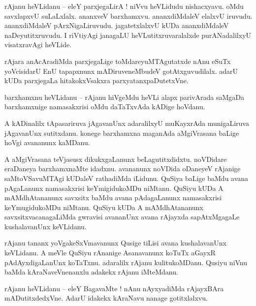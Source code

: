 \documentclass{article}
\begin{document}
\begin{mn}%
rAjanu heVLidanu -- eleY parxjegaLirA ! niVvu heVLidudu nishacxyavu. oMdu savxlapxvU suLaLxlalx. 
ananxveV barxhamxvu. ananxdiMdaleV elalxvU iruvudu. ananxdiMdaleV pArxNigaLiruvudu. jagatetxlalxvU 
kUDa ananxdiMdaleV naDeyutitxruvudu. I riVtiyAgi janagaLU heVLutitxruvaralalxde purANadalilxyU 
visatxravAgi heVLide.
\end{mn}

\begin{mn}%
rAjara anAcAradiMda parxjegaLige toMdareyuMTAgutatxde nAnu eSuTx yoVcisidarU EnU tapapxnunx 
mADiruveneMbudeV gotAtxguvudilalx. adarU kUDa parxjegaLa hitakokxVsakxra parxyatanxpaDutetxVne.
\end{mn}

\begin{mn}%
barxhamxnu heVLidanu -- rAjanu hiVgeMdu heVLi alapx parivArada saMgaDa barxhamxnige namasakxrisi 
oMdu daTaTxvAda kADige hoVdanu.
\end{mn}

\begin{mn}%
A kADinalilx tApasariruva jAgavanUnx adaralilxyU muKayxrAda munigaLiruva jAgavanUnx sutitxdanu. 
konege barxhamxna maganAda aMgiVrasana baLige hoVgi avananunx kaMDanu.
\end{mn}

\begin{mn}%
A aMgiVrasana teVjasusx dikukxgaLanunx beLagutitxdidxtu. noVDidare eraDaneya barxhamxnaMte idadxnu. 
avananunx noVDida oDaneyeV rAjanige saMtoVSavuMTAgi kUDaleV rathadiMda iLidunu. QuSiya baLige baMdu 
avana pAgaLanunx namasakxrisi keYmigidukoMDu niMtanu. QuSiyu kUDa A mAMdhAtananunx savxsitx baMdu 
avana pAdagaLanunx namasakxrisi keYmugidukoMDu niMtanu. QuSiyu kUDa A mAMdhAtananunx 
savxsitxvacanagaLiMda gwravisi avananUnx avana rAjayxda sapAtxMgagaLe kushalavanUnx keVLidanu.
\end{mn}

\begin{mn}%
rAjanu tananx yoVgakeSxVmavanunx Qusige tiLisi avana kushalavanUnx keVLidanu. A meVle QuSiyu 
rAnanige Asanavanunx koTuTx aGayxR pAdAyxdigaLanUnx koTaTxnu. adaralilx rAjanu kulitukoMDanu. 
Qusiyu niVnu baMda kAraNaveVnenanxlu adakekx rAjanu iMteMdanu.
\end{mn}

\begin{mn}%
rAjanu heVLidanu -- eleY BagavaMte ! nAnu nAyxyadiMda rAjayxBAra mADutitxdedxVne. AdarU idakekx 
kAraNavu nanage gotitxlalxvu.
\end{mn}
\end{document}
